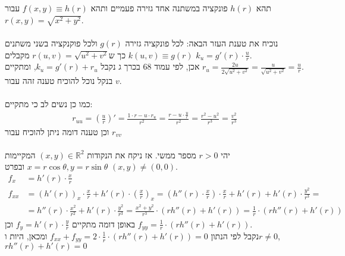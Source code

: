\documentclass{article}
\def\reals{\mathbb{R}}
\begin{document}
תהא $h(r)$ פונקציה במשתנה אחד גזירה פעמיים ותהא $f(x,y)\equiv h(r)$ עבור $r(x,y)=\sqrt{x^2+y^2}$.\\\\
נוכיח את טענת העזר הבאה: לכל פונקציה גזירה $g(r)$ ולכל פוקנקציה בשני משתנים $k(u,v)\equiv g(r)$ כך ש$r(u,v)=\sqrt{u^2+v^2}$ מקבלים $k_u=g'(r) \cdot \frac{u}{r}$. \\
אכן, לפי עמוד 68 בכרך ג נקבל $k_u=g'(r)+r_u$, ומתקיים $r_u=\frac{2u}{2\sqrt{u^2+v^2}}=\frac{u}{\sqrt{u^2+v^2}}=\frac{u}{r}$. \\
בנקל נוכל להוכיח טענה זהה עבור $v$.\\\\
כמו כן נשים לב כי מתקיים:
\begin{align*}
    r_{uu}=(\frac{u}{r})'=\frac{1\cdot r-u\cdot r_u}{r^2}=\frac{r-u\cdot \frac{u}{r}}{r^2}=\frac{r^2-u^2}{r^3}=\frac{v^2}{r^3}
\end{align*}
וכן טענה דומה ניתן להוכיח עבור $r_{vv}$
\\\\
יהי $r>0$ מספר ממשי. אז ניקח את הנקודות $(x,y)\in \reals^2$ המקיימות $x=r\cos \theta, y = r\sin \theta$ ובפרט $(x,y)\ne (0,0)$. \\
\begin{align*}
    f_x    & = h'(r) \cdot \frac{x}{r}                                                 \\
    f_{xx} & = (h'(r))_x \cdot \frac{x}{r} + h'(r) \cdot (\frac{x}{r})_x =
    (h''(r) \cdot \frac{x}{r}) \cdot \frac{x}{r} + h'(r)+h'(r) \cdot \frac{y^2}{r^3} = \\
           & = h''(r) \cdot \frac{x^2}{r^2} + h'(r) \cdot \frac{y^2}{r^3} =
    \frac{x^2+y^2}{r^3} \cdot (rh''(r)+h'(r)) = \frac{1}{r} \cdot (rh''(r)+h'(r))
\end{align*}
באופן דומה מתקיים $f_y=h'(r)\cdot \frac{y}{r}$ וכן $f_{yy}=\frac{1}{r} \cdot (rh''(r)+h'(r))$.\\
נקבל לפי הנתון $f_{xx}+f_{yy}=2\cdot \frac{1}{r} \cdot (rh''(r)+h'(r))=0$ ומכאן, היות ו$r\ne 0$, $rh''(r)+h'(r)=0$
\end{document}
